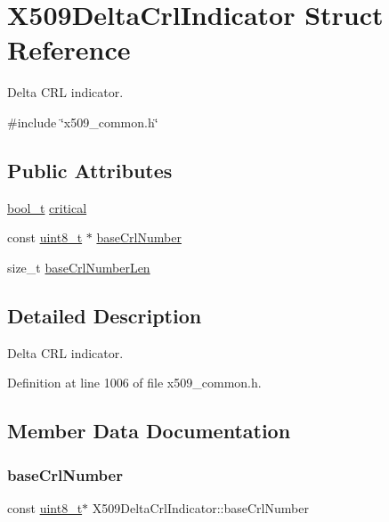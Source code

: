 \hypertarget{structX509DeltaCrlIndicator}{}\section{X509\+Delta\+Crl\+Indicator Struct Reference}
\label{structX509DeltaCrlIndicator}


Delta C\+RL indicator.  




{\ttfamily \#include \char`\"{}x509\+\_\+common.\+h\char`\"{}}

\subsection*{Public Attributes}
\begin{DoxyCompactItemize}
\item 
\hyperlink{compiler__port_8h_a812d16e5494522586b3784e55d479912}{bool\+\_\+t} \hyperlink{structX509DeltaCrlIndicator_a019a2a9523e49ff3fb04a3eafa033a8e}{critical}
\item 
const \hyperlink{stdint_8h_aba7bc1797add20fe3efdf37ced1182c5}{uint8\+\_\+t} $\ast$ \hyperlink{structX509DeltaCrlIndicator_a46db19e937cde0b512f7bb8c023381cc}{base\+Crl\+Number}
\item 
size\+\_\+t \hyperlink{structX509DeltaCrlIndicator_a0480df76b12e9bc47214eed6d60fed66}{base\+Crl\+Number\+Len}
\end{DoxyCompactItemize}


\subsection{Detailed Description}
Delta C\+RL indicator. 

Definition at line 1006 of file x509\+\_\+common.\+h.



\subsection{Member Data Documentation}
\mbox{\label{structX509DeltaCrlIndicator_a46db19e937cde0b512f7bb8c023381cc}} 
\subsubsection{\texorpdfstring{base\+Crl\+Number}{baseCrlNumber}}
{\footnotesize\ttfamily const \hyperlink{stdint_8h_aba7bc1797add20fe3efdf37ced1182c5}{uint8\+\_\+t}$\ast$ X509\+Delta\+Crl\+Indicator\+::base\+Crl\+Number}



